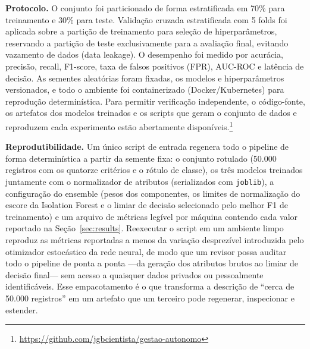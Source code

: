 \documentclass[conference]{IEEEtran}
\begin{document}
\textbf{Protocolo.} O conjunto foi particionado de forma estratificada em
70\% para treinamento e 30\% para teste. Validação cruzada estratificada
com 5 folds foi aplicada sobre a partição de treinamento para seleção de
hiperparâmetros, reservando a partição de teste exclusivamente para a
avaliação final, evitando vazamento de dados (data leakage). O desempenho
foi medido por acurácia, precisão, recall, F1-score, taxa de falsos
positivos (FPR), AUC-ROC e latência de decisão. As sementes aleatórias
foram fixadas, os modelos e hiperparâmetros versionados, e todo o
ambiente foi containerizado (Docker/Kubernetes) para reprodução
determinística. Para permitir verificação independente, o código-fonte,
os artefatos dos modelos treinados e os scripts que geram o conjunto de
dados e reproduzem cada experimento estão abertamente
disponíveis.\footnote{\url{https://github.com/jgbcientista/gestao-autonomo}}

\textbf{Reprodutibilidade.} Um único script de entrada regenera todo o
pipeline de forma determinística a partir da semente fixa: o conjunto
rotulado (50.000 registros com os quatorze critérios e o rótulo de
classe), os três modelos treinados juntamente com o normalizador de
atributos (serializados com \texttt{joblib}), a configuração do ensemble
(pesos dos componentes, os limites de normalização do escore da
Isolation Forest e o limiar de decisão selecionado pelo melhor F1 de
treinamento) e um arquivo de métricas legível por máquina contendo cada
valor reportado na Seção~\ref{sec:results}. Reexecutar o script em um
ambiente limpo reproduz as métricas reportadas a menos da variação
desprezível introduzida pelo otimizador estocástico da rede neural, de
modo que um revisor possa auditar todo o pipeline de ponta a ponta ---da
geração dos atributos brutos ao limiar de decisão final--- sem acesso a
quaisquer dados privados ou pessoalmente identificáveis. Esse
empacotamento é o que transforma a descrição de ``cerca de 50.000
registros'' em um artefato que um terceiro pode regenerar, inspecionar e
estender.
\end{document}
